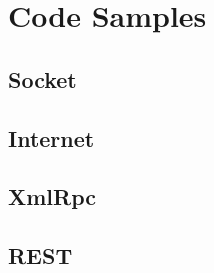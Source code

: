 \documentclass[10pt]{article}
\begin{document}
\section{Code Samples}
\subsection{Socket}


\subsection{Internet}


\subsection{XmlRpc}


\subsection{REST}


\end{document}
